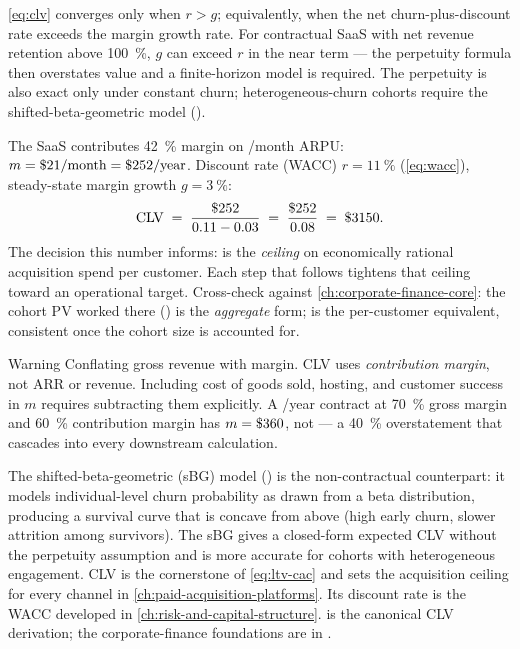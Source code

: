\cref{eq:clv} converges only when \(r > g\); equivalently, when the net churn-plus-discount rate exceeds the margin growth rate. For contractual SaaS with net revenue retention above \qty{100}{\percent}, \(g\) can exceed \(r\) in the near term --- the perpetuity formula then overstates value and a finite-horizon model is required. The perpetuity is also exact only under constant churn; heterogeneous-churn cohorts require the shifted-beta-geometric model (\textcite{fader2005rfm}).

\begin{example}
The SaaS contributes \qty{42}{\percent} margin on /month ARPU: \(m = \$\num{21}/\text{month} = \$\num{252}/\text{year}\). Discount rate (WACC) \(r = \qty{11}{\percent}\) (\cref{eq:wacc}), steady-state margin growth \(g = \qty{3}{\percent}\):
\[
  \mathrm{CLV} \;=\; \frac{\$\num{252}}{0.11 - 0.03} \;=\; \frac{\$\num{252}}{0.08} \;=\; \$\num{3150}.
\]
The decision this number informs:  is the \emph{ceiling} on economically rational acquisition spend per customer. Each step that follows tightens that ceiling toward an operational target. Cross-check against \cref{ch:corporate-finance-core}: the cohort PV worked there () is the \emph{aggregate} form;  is the per-customer equivalent, consistent once the cohort size is accounted for.
\end{example}

\begin{admonition}{Warning}
Conflating gross revenue with margin. CLV uses \emph{contribution margin}, not ARR or revenue. Including cost of goods sold, hosting, and customer success in \(m\) requires subtracting them explicitly. A /year contract at \qty{70}{\percent} gross margin and \qty{60}{\percent} contribution margin has \(m = \$\num{360}\), not  --- a \qty{40}{\percent} overstatement that cascades into every downstream calculation.
\end{admonition}

The shifted-beta-geometric (sBG) model (\textcite{fader2005rfm}) is the non-contractual counterpart: it models individual-level churn probability as drawn from a beta distribution, producing a survival curve that is concave from above (high early churn, slower attrition among survivors). The sBG gives a closed-form expected CLV without the perpetuity assumption and is more accurate for cohorts with heterogeneous engagement. CLV is the cornerstone of \cref{eq:ltv-cac} and sets the acquisition ceiling for every channel in \cref{ch:paid-acquisition-platforms}. Its discount rate is the WACC developed in \cref{ch:risk-and-capital-structure}. \textcite{gupta2004customer} is the canonical CLV derivation; the corporate-finance foundations are in \textcite{brealey2020}.

